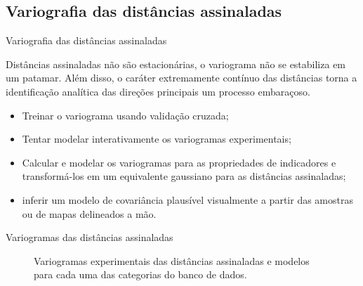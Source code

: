 \documentclass[aspectratio=169]{beamer}
\begin{document}
\subsection{Variografia das distâncias assinaladas}

\begin{frame}{Variografia das distâncias assinaladas}

Distâncias assinaladas não são estacionárias, o variograma não se estabiliza em um patamar. Além disso, o caráter extremamente contínuo das distâncias torna a identificação analítica das direções principais um processo embaraçoso.

\begin{itemize}
	\item Treinar o variograma usando validação cruzada;
	\item Tentar modelar interativamente os variogramas experimentais;
	\item Calcular e modelar os variogramas para as propriedades de indicadores e transformá-los em um equivalente gaussiano para as distâncias assinaladas;
	\item inferir um modelo de covariância plausível visualmente a partir das amostras ou de mapas delineados a mão.
\end{itemize}
\end{frame}

\begin{frame}{Variogramas das distâncias assinaladas}
\begin{figure}[H] 
	\caption{Variogramas experimentais das distâncias assinaladas e modelos para cada uma das categorias do banco de dados.} \label{sd_var}
	\centering
\end{figure}
\end{frame}
\end{document}
